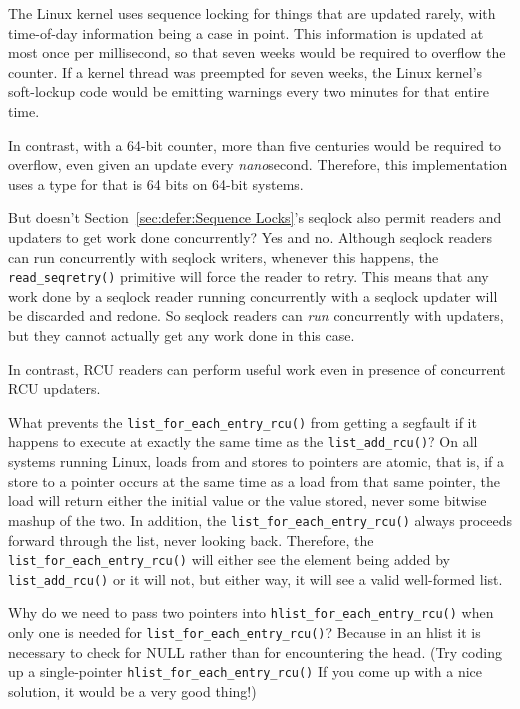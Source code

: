 	The Linux kernel uses sequence locking for things that are
	updated rarely, with time-of-day information being a case
	in point.
	This information is updated at most once per millisecond,
	so that seven weeks would be required to overflow the counter.
	If a kernel thread was preempted for seven weeks, the Linux
	kernel's soft-lockup code would be emitting warnings every two
	minutes for that entire time.

	In contrast, with a 64-bit counter, more than five centuries
	would be required to overflow, even given an update every
	\emph{nano}second.
	Therefore, this implementation uses a type for 
	that is 64 bits on 64-bit systems.

\QuickQ{}
	But doesn't Section~\ref{sec:defer:Sequence Locks}'s seqlock
	also permit readers and updaters to get work done concurrently?
\QuickA{}
	Yes and no.
	Although seqlock readers can run concurrently with
	seqlock writers, whenever this happens, the {\tt read\_seqretry()}
	primitive will force the reader to retry.
	This means that any work done by a seqlock reader running concurrently
	with a seqlock updater will be discarded and redone.
	So seqlock readers can \emph{run} concurrently with updaters,
	but they cannot actually get any work done in this case.

	In contrast, RCU readers can perform useful work even in presence
	of concurrent RCU updaters.

\QuickQ{}
	What prevents the {\tt list\_for\_each\_entry\_rcu()} from
	getting a segfault if it happens to execute at exactly the same
	time as the {\tt list\_add\_rcu()}?
\QuickA{}
	On all systems running Linux, loads from and stores
	to pointers are atomic, that is, if a store to a pointer occurs at
	the same time as a load from that same pointer, the load will return
	either the initial value or the value stored, never some bitwise
	mashup of the two.
	In addition, the {\tt list\_for\_each\_entry\_rcu()} always proceeds
	forward through the list, never looking back.
	Therefore, the {\tt list\_for\_each\_entry\_rcu()} will either see
	the element being added by {\tt list\_add\_rcu()} or it will not,
	but either way, it will see a valid well-formed list.

\QuickQ{}
	Why do we need to pass two pointers into
	{\tt hlist\_for\_each\_entry\_rcu()}
	when only one is needed for {\tt list\_for\_each\_entry\_rcu()}?
\QuickA{}
	Because in an hlist it is necessary to check for
	NULL rather than for encountering the head.
	(Try coding up a single-pointer {\tt hlist\_for\_each\_entry\_rcu()}
	If you come up with a nice solution, it would be a very good thing!)

